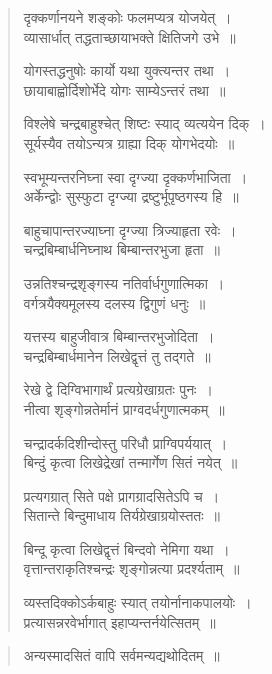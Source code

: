 \documentclass[11pt, openany]{book}
\begin{document}
\begin{quote}
{\qt दृक्कर्णानयने शङ्कोः फलमप्यत्र योजयेत्~।\\
व्यासार्धात् तद्धताच्छायाभक्ते क्षितिजगे उभे~॥

योगस्तद्धनुषोः कार्यो यथा युक्त्यन्तर तथा~।\\
छायाबाह्वोर्दिशोर्भेदे योगः साम्येऽन्तरं तथा~॥

विश्लेषे चन्द्रबाहुश्चेत् शिष्टः स्याद् व्यत्ययेन दिक्~।\\
सूर्यस्यैव तयोऽन्यत्र ग्राह्या दिक् योगभेदयोः~॥

स्वभूम्यन्तरनिघ्ना स्वा दृग्ज्या दृक्कर्णभाजिता~।\\
अर्केन्द्वोः सुस्फुटा दृग्ज्या द्रष्टुर्भूपृष्ठगस्य हि~॥

बाहुचापान्तरज्याघ्ना दृग्ज्या त्रिज्याहृता रवेः~।\\
चन्द्रबिम्बार्धनिघ्नाथ बिम्बान्तरभुजा हृता~॥

उन्नतिश्चन्द्रशृङ्गस्य नतिर्वार्धगुणात्मिका~।\\
वर्गत्रयैक्यमूलस्य दलस्य द्विगुणं धनुः~॥

यत्तस्य बाहुजीवात्र बिम्बान्तरभुजोदिता~। \\
चन्द्रबिम्बार्धमानेन लिखेद्वृत्तं तु तद्गते~॥

रेखे द्वे दिग्विभागार्थं प्रत्यग्रेखाग्रतः पुनः~।\\
नीत्वा शृङ्गोन्नतेर्मानं प्राग्वदर्धगुणात्मकम्~॥

चन्द्रादर्कदिशीन्दोस्तु परिधौ प्राग्विपर्ययात्~।\\
बिन्दुं कृत्वा लिखेद्रेखां तन्मार्गेण सितं नयेत्~॥

प्रत्यगग्रात् सिते पक्षे प्रागग्रादसितेऽपि च~।\\
सितान्ते बिन्दुमाधाय तिर्यग्रेखाग्रयोस्ततः~॥

बिन्दू कृत्वा लिखेद्वृत्तं बिन्दवो नेमिगा यथा~।\\
वृत्तान्तराकृतिश्चन्द्रः शृङ्गोन्नत्या प्रदर्श्यताम्~॥

व्यस्तदिक्कोऽर्कबाहुः स्यात् तयोर्नानाकपालयोः~।\\
प्रत्यासन्नरवेर्भागात् इहाप्यन्तर्नयेत्सितम्~॥}
\end{quote}
 
\newpage

\begin{quote} 
{\qt अन्यस्मादसितं वापि सर्वमन्यद्यथोदितम्~॥}
 \end{quote}
\end{document}
